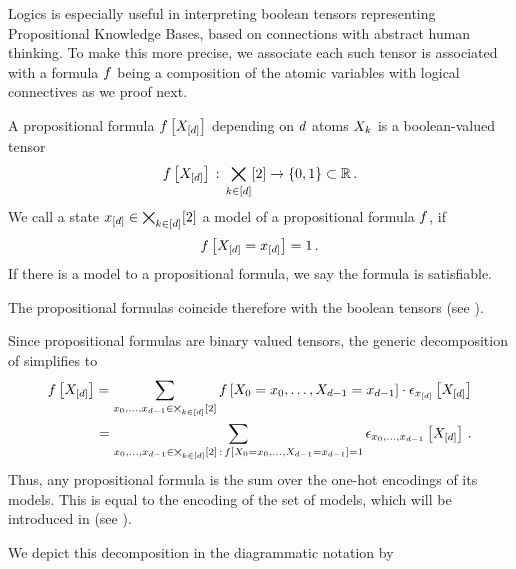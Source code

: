 
Logics is especially useful in interpreting boolean tensors representing Propositional Knowledge Bases, based on connections with abstract human thinking.
To make this more precise, we associate each such tensor is associated with a formula $f$ being a composition of the atomic variables with logical connectives as we proof next.

\begin{definition}
    \label{def:formulas}
    A propositional formula $f\left[X_{[d]}\right]$ depending on $d$ atoms $X_{k}$ is a boolean-valued tensor
    \begin{align*}
        f\left[X_{[d]}\right] \,:\, \bigtimes_{k\in[d]}[2] \rightarrow \{0,1\} \subset \mathbb{R} \, .
    \end{align*}
    We call a state $x_{[d]} \in \bigtimes_{k\in[d]}[2]$ a model of a propositional formula $f$, if
    \begin{align*}
        f\left[X_{[d]}=x_{[d]}\right]=1 \, .
    \end{align*}
    If there is a model to a propositional formula, we say the formula is satisfiable.
\end{definition}

The propositional formulas coincide therefore with the boolean tensors (see ).


Since propositional formulas are binary valued tensors, the generic decomposition of  simplifies to
\begin{align}
    \label{eq:formulaModelDecomposition}
    f\left[X_{[d]}\right] = \sum_{x_{0},\ldots,x_{d-1}\in\bigtimes_{k\in[d]}[2]} f\left[X_{0}=x_{0},\ldots,X_{d-1}=x_{d-1}\right] \cdot \epsilon_{x_{[d]}}\left[X_{[d]}\right] \\
    = \sum_{x_{0},\ldots,x_{d-1}\in\bigtimes_{k\in[d]}[2] \,:\, f\left[X_{0}=x_{0},\ldots,X_{d-1}=x_{d-1}\right]=1}  \epsilon_{x_{0},\ldots,x_{d-1}}\left[X_{[d]}\right] \, .
\end{align}
Thus, any propositional formula is the sum over the one-hot encodings of its models.
This is equal to the encoding of the set of models, which will be introduced in  (see ).

We depict this decomposition in the diagrammatic notation by
\begin{center}
    
\end{center}

